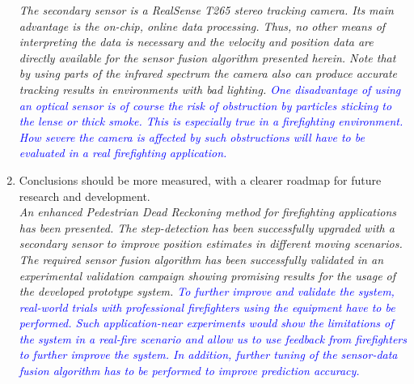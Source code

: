 \documentclass{article}
\begin{document}
\begin{enumerate}
\textit{The secondary sensor is a RealSense T265 stereo tracking camera. Its main advantage is the on-chip, online data processing. Thus, no other means of interpreting the data is necessary and the velocity and position data are directly available for the sensor  fusion algorithm presented herein. Note that by using parts of the infrared spectrum the camera also can produce accurate tracking results in environments with bad lighting. \textcolor{blue}{One disadvantage of using an optical sensor is of course the risk of obstruction by particles sticking to the lense or thick smoke. This is especially true in a firefighting environment. How severe the camera is affected by such obstructions will have to be evaluated in a real firefighting application.}}\\



\item Conclusions should be more measured, with a clearer roadmap for future research and development.\\

\textit{An enhanced Pedestrian Dead Reckoning method for firefighting applications has been presented. The step-detection  has been successfully upgraded with a secondary sensor to improve  position estimates in different moving scenarios. The required sensor fusion algorithm has been successfully  validated in an experimental validation campaign showing promising results for the usage of the developed prototype system.  \textcolor{blue}{To further improve and validate the system, real-world trials with professional firefighters using the equipment have to be performed. Such application-near experiments would show the limitations of the system in a real-fire scenario and allow us to use feedback from firefighters to further improve the system. In addition, further tuning of the sensor-data fusion algorithm has to be performed to improve prediction accuracy.}}



\end{enumerate}





\end{document}
